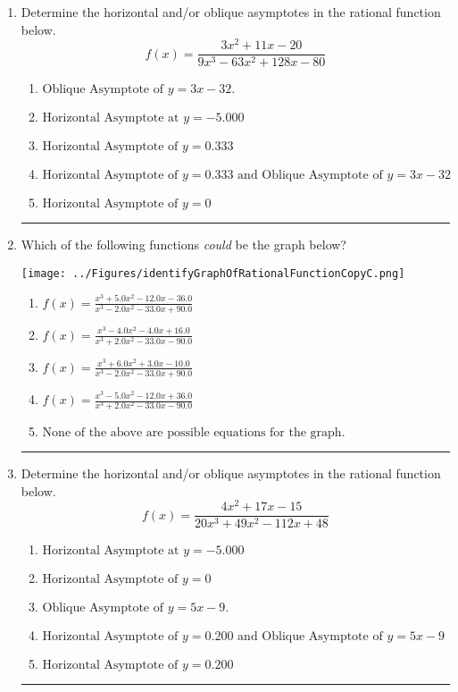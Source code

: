 \documentclass[14pt]{extbook}
\newcommand{\litem}[1]{\item#1\hspace*{-1cm}\rule{\textwidth}{0.4pt}}
\begin{document}
\begin{enumerate}
{\begin{enumerate}[label=\Alph*.]
\end{enumerate} }
\litem{
Determine the horizontal and/or oblique asymptotes in the rational function below.\[ f(x) = \frac{3x^{2} +11 x -20}{9x^{3} -63 x^{2} +128 x -80} \]\begin{enumerate}[label=\Alph*.]
\item \( \text{Oblique Asymptote of } y = 3x -32. \)
\item \( \text{Horizontal Asymptote at } y = -5.000 \)
\item \( \text{Horizontal Asymptote of } y = 0.333  \)
\item \( \text{Horizontal Asymptote of } y = 0.333 \text{ and Oblique Asymptote of } y = 3x -32 \)
\item \( \text{Horizontal Asymptote of } y = 0 \)

\end{enumerate} }
\litem{
Which of the following functions \textit{could} be the graph below?
\begin{center}
    \texttt{[image: ../Figures/identifyGraphOfRationalFunctionCopyC.png]}
\end{center}
\begin{enumerate}[label=\Alph*.]
\item \( f(x)=\frac{x^{3} +5.0 x^{2} -12.0 x -36.0}{x^{3} -2.0 x^{2} -33.0 x + 90.0} \)
\item \( f(x)=\frac{x^{3} -4.0 x^{2} -4.0 x + 16.0}{x^{3} +2.0 x^{2} -33.0 x -90.0} \)
\item \( f(x)=\frac{x^{3} +6.0 x^{2} +3.0 x -10.0}{x^{3} -2.0 x^{2} -33.0 x + 90.0} \)
\item \( f(x)=\frac{x^{3} -5.0 x^{2} -12.0 x + 36.0}{x^{3} +2.0 x^{2} -33.0 x -90.0} \)
\item \( \text{None of the above are possible equations for the graph.} \)

\end{enumerate} }
\litem{
Determine the horizontal and/or oblique asymptotes in the rational function below.\[ f(x) = \frac{4x^{2} +17 x -15}{20x^{3} +49 x^{2} -112 x + 48} \]\begin{enumerate}[label=\Alph*.]
\item \( \text{Horizontal Asymptote at } y = -5.000 \)
\item \( \text{Horizontal Asymptote of } y = 0 \)
\item \( \text{Oblique Asymptote of } y = 5x -9. \)
\item \( \text{Horizontal Asymptote of } y = 0.200 \text{ and Oblique Asymptote of } y = 5x -9 \)
\item \( \text{Horizontal Asymptote of } y = 0.200  \)


\end{enumerate}}
\end{enumerate}
\end{document}
